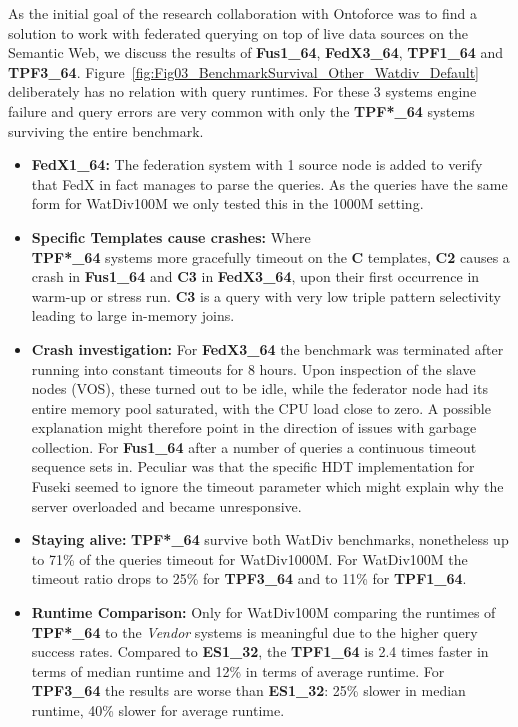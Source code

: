 As the initial goal of the research collaboration with Ontoforce was to find a solution to work with federated querying on top of live data sources on the Semantic Web, we discuss the results of \textbf{Fus1\_64}, \textbf{FedX3\_64}, \textbf{TPF1\_64} and \textbf{TPF3\_64}. 
Figure~\ref{fig:Fig03_BenchmarkSurvival_Other_Watdiv_Default} deliberately has no relation with query runtimes. For these 3 systems engine failure and query errors are very common with only the \textbf{TPF*\_64} systems surviving the entire benchmark. 
\begin{itemize}
	\item \textbf{FedX1\_64:} The federation system with 1 source node is added to verify that FedX in fact manages to parse the queries. As the queries have the same form for WatDiv100M we only tested this in the 1000M setting.
	\item \textbf{Specific Templates cause crashes:} Where \\ \textbf{TPF*\_64} systems more gracefully timeout on the \textbf{C} templates, \textbf{C2} causes a crash in \textbf{Fus1\_64} and \textbf{C3} in \textbf{FedX3\_64}, upon their first occurrence in warm-up or stress run. \textbf{C3} is a query with very low triple pattern selectivity leading to large in-memory joins.
	\item \textbf{Crash investigation:} For \textbf{FedX3\_64} the benchmark was terminated after running into constant timeouts for 8 hours. Upon inspection of the slave nodes (VOS), these turned out to be idle, while the federator node had its entire memory pool saturated, with the CPU load close to zero. A possible explanation might therefore point in the direction of issues with garbage collection.
	For \textbf{Fus1\_64} after a number of queries a continuous timeout sequence sets in. Peculiar was that the specific HDT implementation for Fuseki seemed to ignore the timeout parameter which might explain why the server overloaded and became unresponsive.
	\item \textbf{Staying alive:} \textbf{TPF*\_64} survive both WatDiv benchmarks, nonetheless up to 71\% of the queries timeout for WatDiv1000M. For WatDiv100M the timeout ratio drops to 25\% for \textbf{TPF3\_64} and to 11\% for \textbf{TPF1\_64}.
%
	\item \textbf{Runtime Comparison: } Only for WatDiv100M comparing the runtimes of \textbf{TPF*\_64} to the \emph{Vendor} systems is meaningful due to the higher query success rates. Compared to \textbf{ES1\_32}, the \textbf{TPF1\_64} is 2.4 times faster in terms of median runtime and 12\% in terms of average runtime. For \textbf{TPF3\_64} the results are worse than \textbf{ES1\_32}: 25\% slower in median runtime, 40\% slower for average runtime.
\end{itemize}
